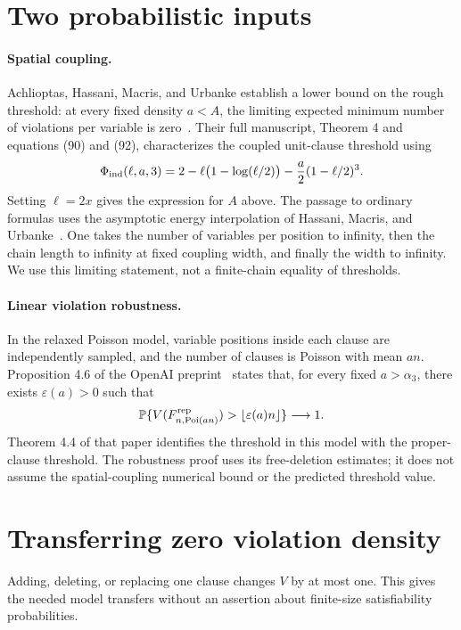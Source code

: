 \documentclass[11pt]{article}
\newcommand{\Prb}{\mathbb P}
\begin{document}
\section{Two probabilistic inputs}
\paragraph{Spatial coupling.}
Achlioptas, Hassani, Macris, and Urbanke establish a lower bound on the
rough threshold: at every fixed density $a<A$, the limiting expected
minimum number of violations per variable is zero~\cite{AHMU}.
Their full manuscript, Theorem 4 and equations (90) and (92), characterizes the
coupled unit-clause threshold using
\[
 \Phi_{\rm ind}(\ell,a,3)
 =2-\ell\bigl(1-\log(\ell/2)\bigr)
       -\frac a2(1-\ell/2)^3.
\]
Setting $\ell=2x$ gives the expression for $A$ above. The passage to
ordinary formulas uses the asymptotic energy interpolation of
Hassani, Macris, and Urbanke~\cite[Theorems 1--2]{HMU}.
One takes the number of variables per position to infinity, then
the chain length to infinity at fixed coupling width, and finally
the width to infinity. We use this limiting statement, not a
finite-chain equality of thresholds.

\paragraph{Linear violation robustness.}
In the relaxed Poisson model, variable positions inside each clause
are independently sampled, and the number of clauses is Poisson with
mean $an$. Proposition 4.6 of the OpenAI preprint~\cite{OpenAI} states that, for every fixed
$a>\alpha_3$, there exists $\varepsilon(a)>0$ such that
\begin{equation}\label{eq:robust}
 \Prb\{V(F^{\rm rep}_{n,\operatorname{Poi}(an)})
                   >\lfloor\varepsilon(a)n\rfloor\}\longrightarrow1.
\end{equation}
Theorem 4.4 of that paper identifies the threshold in this model
with the proper-clause threshold. The robustness proof uses its
free-deletion estimates; it does not assume the spatial-coupling
numerical bound or the predicted threshold value.

\section{Transferring zero violation density}
Adding, deleting, or replacing one clause changes $V$ by at most one.
This gives the needed model transfers without an assertion about
finite-size satisfiability probabilities.
\end{document}
